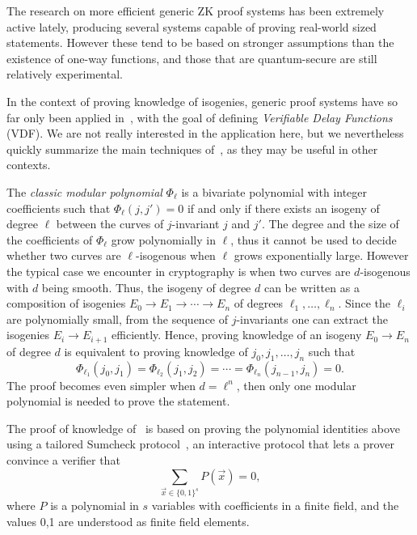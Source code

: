 \documentclass{llncs}
\begin{document}
The research on more efficient generic ZK proof systems has been extremely active lately, producing several systems capable of proving real-world sized statements.
However these tend to be based on stronger assumptions than the existence of one-way functions, and those that are quantum-secure are still relatively experimental.

In the context of proving knowledge of isogenies, generic proof systems have so far only been applied in~\cite{10.1007/978-3-030-99277-4_21}, with the goal of defining \emph{Verifiable Delay Functions} (VDF).
We are not really interested in the application here, but we nevertheless quickly summarize the main techniques of~\cite{10.1007/978-3-030-99277-4_21}, as they may be useful in other contexts.

The \emph{classic modular polynomial} $\Phi_\ell$ is a bivariate polynomial with integer coefficients such that $\Phi_\ell(j, j') = 0$ if and only if there exists an isogeny of degree $\ell$ between the curves of $j$-invariant $j$ and $j'$.
The degree and the size of the coefficients of $\Phi_\ell$ grow polynomially in $\ell$, thus it cannot be used to decide whether two curves are $\ell$-isogenous when $\ell$ grows exponentially large.
However the typical case we encounter in cryptography is when two curves are $d$-isogenous with $d$ being smooth.
Thus, the isogeny of degree $d$ can be written as a composition of isogenies $E_0 \to E_1 \to \cdots \to E_n$ of degrees $\ell_1, \ldots, \ell_n$.
Since the $\ell_i$ are polynomially small, from the sequence of $j$-invariants one can extract the isogenies $E_i \to E_{i+1}$ efficiently. Hence, proving knowledge of an isogeny $E_0 \to E_n$ of degree $d$ is equivalent to proving knowledge of $j_0, j_1, \ldots, j_n$ such that
\begin{equation}
    \label{eq:modpol}
    \Phi_{\ell_1}(j_0, j_1) = \Phi_{\ell_2}(j_1, j_2) = \cdots = \Phi_{\ell_n}(j_{n-1},j_n) = 0.
\end{equation}
The proof becomes even simpler when $d = \ell^n$, then only one modular polynomial is needed to prove the statement.

The proof of knowledge of~\cite{10.1007/978-3-030-99277-4_21} is based on proving the  polynomial identities above using a tailored Sumcheck protocol~\cite{10.1145/146585.146605}, an interactive protocol that lets a prover convince a verifier that
\begin{equation}
    \sum_{\vec{x}\in\{0,1\}^s} P(\vec{x}) = 0,
\end{equation}
where $P$ is a polynomial in $s$ variables with coefficients in a finite field, and the values 0,1 are understood as finite field elements.
\end{document}
